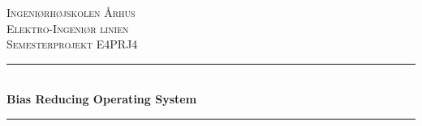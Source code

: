 \newcommand{\HRule}{\rule{\linewidth}{0.5mm}} %

\begin{center} %
 

\textsc{\LARGE Ingeniørhøjskolen Århus}\\[1.5cm] %
\textsc{\Large Elektro-Ingeniør linien}\\[0.5cm] %
\textsc{\large Semesterprojekt E4PRJ4}\\[0.5cm] %


\HRule \\[0.4cm]
{ \huge \bfseries Bias Reducing Operating System}\\[0.4cm] %
\HRule \\[1.5cm]
 


\end{center}
